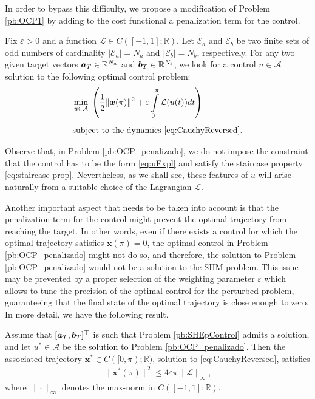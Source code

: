\documentclass[twocolumn]{autart}    %
\begin{document}
In order to bypass this difficulty, we propose a modification of Problem \ref{pb:OCP1} by adding to the cost functional a penalization term for the control. 

\bigskip

\begin{problem}\label{pb:OCP_penalizado}
Fix $\varepsilon>0$ and a function $\mathcal{L}\in C([-1,1];\mathbb{R})$.  Let $\mathcal{E} _a $ and $\mathcal{E} _b $ be two finite sets of odd numbers of cardinality $|\mathcal{E}_a| = N_a $ and $ |\mathcal{E} _b| = N_b$, respectively. For any two given target vectors $\bm{a}_T \in \mathbb{R}^{N_a}$ and $\bm{b}_T \in \mathbb{R}^{N_b} $, we look for a control $u\in \mathcal A$ solution to the following optimal control problem:
\begin{align*}
	&\displaystyle\min_{u \in \mathcal A}\;\left(\dfrac{1}{2} \|\bm{x}(\pi)\|^2 + \varepsilon \displaystyle\int_0^\pi \mathcal{L}(u(t)) dt\right) 
	\\[5pt] 
	&\text{subject to the dynamics \eqref{eq:CauchyReversed}}.
\end{align*}
\end{problem}
Observe that, in Problem \ref{pb:OCP_penalizado}, we do not impose the constraint that the control has to be the form \eqref{eq:uExpl} and satisfy the staircase property \eqref{eq:staircase prop}. Nevertheless, as we shall see, these features of $u$ will arise naturally from a suitable choice of the Lagrangian $\mathcal{L}$.

Another important aspect that needs to be taken into account is that the penalization term for the control might prevent the optimal trajectory from reaching the target. In other words, even if there exists a control for which the optimal trajectory satisfies $\bm{x} (\pi) = 0$, the optimal control in Problem \ref{pb:OCP_penalizado} might not do so, and therefore, the solution to Problem \ref{pb:OCP_penalizado} would not be a solution to the SHM problem. This issue may be prevented by a proper selection of the weighting parameter $\varepsilon$ which allows to tune the precision of the optimal control for the perturbed problem, guaranteeing that the final state of the optimal trajectory is close enough to zero. In more detail, we have the following result.

\bigskip

\begin{proposition}\label{Prop:approx controllability}
Assume that $[\bm{a}_T,\bm{b}_T]^\top$ is such that Problem \ref{pb:SHEpControl} admits a solution, and let $u^\ast\in \mathcal A$ be the solution to Problem \ref{pb:OCP_penalizado}. Then the associated trajectory $\bm{x}^\ast\in C([0,\pi);\mathbb{R})$, solution to \eqref{eq:CauchyReversed}, satisfies
\begin{align*} 
	\| \bm{x}^\ast (\pi)  \|^2 \leq  4 \varepsilon \pi \| \mathcal{L}\|_\infty,
\end{align*}
where $\| \cdot\|_\infty$ denotes the max-norm in $C([-1,1]; \mathbb{R})$.
\end{proposition}
\end{document}
